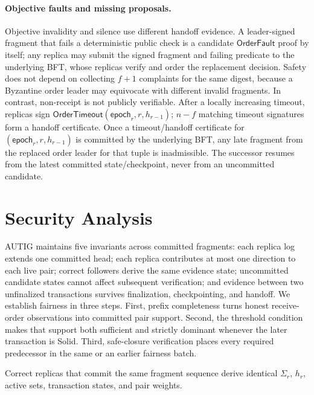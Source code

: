 \paragraph{Objective faults and missing proposals.}
Objective invalidity and silence use different handoff evidence.  A
leader-signed fragment that fails a deterministic public check is a candidate
$\mathsf{OrderFault}$ proof by itself; any replica may submit the signed
fragment and failing predicate to the underlying BFT, whose replicas verify
and order the replacement decision.  Safety does not depend on collecting
$f+1$ complaints for the same digest, because a Byzantine order leader may
equivocate with different invalid fragments.  In contrast, non-receipt is not
publicly verifiable.  After a locally increasing timeout, replicas sign
$\mathsf{OrderTimeout}(\mathsf{epoch}_r,r,h_{r-1})$; $n-f$ matching timeout
signatures form a handoff certificate.  Once a timeout/handoff certificate for
$(\mathsf{epoch}_r,r,h_{r-1})$ is committed by the underlying BFT, any late
fragment from the replaced order leader for that tuple is inadmissible.  The
successor resumes from the latest committed state/checkpoint, never from an
uncommitted candidate.

\section{Security Analysis}
\label{sec:analysis}

AUTIG maintains five invariants across committed fragments: each replica log
extends one committed head; each replica contributes at most one direction to
each live pair; correct followers derive the same evidence state; uncommitted
candidate states cannot affect subsequent verification; and evidence between
two unfinalized transactions survives finalization, checkpointing, and
handoff.  We establish fairness in three steps.  First, prefix completeness
turns honest receive-order observations into committed pair support.  Second,
the threshold condition makes that support both sufficient and strictly
dominant whenever the later transaction is Solid.  Third, safe-closure
verification places every required predecessor in the same or an earlier
fairness batch.

\begin{theorem}
\label{thm:state-agreement}
Correct replicas that commit the same fragment sequence derive identical
$\Sigma_r$, $h_r$, active sets, transaction states, and pair weights.
\end{theorem}

